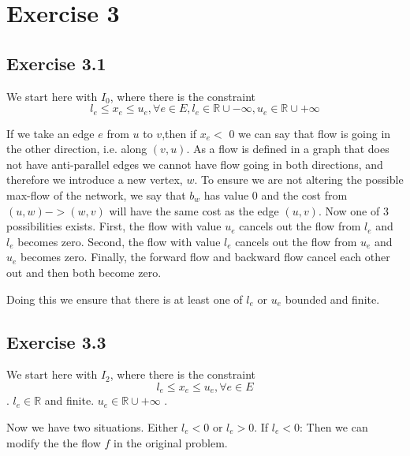 \section{Exercise 3}
\subsection{Exercise 3.1}

We start here with \(I_0\), where there is the constraint \[ l_e \le x_e \le u_e, \forall e \in E, l_e \in \mathbb{R} \cup -\infty,  u_e \in \mathbb{R} \cup + \infty \]

If we take an edge \(e\) from \(u\) to \(v\),then  if \(x_e <\) 0  we can say that flow is going in the other direction, i.e. along \((v,u)\). As a flow is defined in a graph that does not have anti-parallel edges we cannot have flow going in both directions, and therefore we introduce a new vertex, \(w\). To ensure we are not altering the possible max-flow of the network, we say that \(b_{w}\) has value 0 and the cost from \((u,w)->(w,v)\) will have the same cost as the edge \((u,v)\). Now one of 3 possibilities exists.\newline
First, the flow with value \(u_e\) cancels out the flow from \(l_e\) and \(l_e\) becomes zero.
Second, the flow with value \(l_e\) cancels out the flow from \(u_e\) and \(u_e\) becomes zero.
Finally, the forward flow and backward flow cancel each other out and then both become zero.

Doing this we ensure that there is at least one of \(l_e\) or \(u_e\) bounded and finite.


\subsection{Exercise 3.3}
We start here with \(I_2\), where there is the constraint \[ l_e \le x_e \le u_e, \forall e \in E \].
\( l_e \in \mathbb{R}\) and finite. \( u_e \in \mathbb{R} \cup +\infty\) . 

Now we have two situations. Either \(l_e<0\) or \(l_e > 0\).
If \(l_e<0\): Then we can modify the the flow \(f\) in the original problem.



